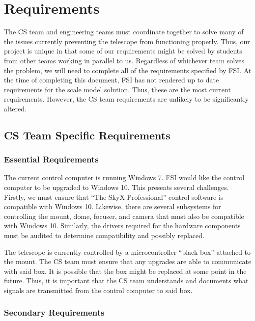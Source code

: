 \documentclass[12pt]{report}
\begin{document}
\section*{Requirements}

The CS team and engineering teams must coordinate together to solve many of the issues currently preventing the telescope from functioning properly. Thus, our project is unique in that some of our requirements might be solved by students from other teams working in parallel to us. Regardless of whichever team solves the problem, we will need to complete all of the requirements specified by FSI.
At the time of completing this document, FSI has not rendered up to date requirements for the scale model solution. Thus, these are the most current requirements. However, the CS team requirements are unlikely to be significantly altered.

\subsection*{CS Team Specific Requirements}

\subsubsection*{Essential Requirements}

The current control computer is running Windows 7. FSI would like the control computer to be upgraded to Windows 10. This presents several challenges. Firstly, we must ensure that “The SkyX Professional” control software is compatible with Windows 10. Likewise, there are several subsystems for controlling the mount, dome, focuser, and camera that must also be compatible with Windows 10. Similarly, the drivers required for the hardware components must be audited to determine compatibility and possibly replaced.

The telescope is currently controlled by a microcontroller “black box” attached to the mount. The CS team must ensure that any upgrades are able to communicate with said box. It is possible that the box might be replaced at some point in the future. Thus, it is important that the CS team understands and documents what signals are transmitted from the control computer to said box.

\subsubsection*{Secondary Requirements}
\end{document}
